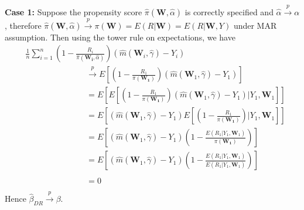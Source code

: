 \documentclass[12pt,twoside]{article}
\begin{document}
\textbf{Case 1:} Suppose the propensity score $\hat\pi(\mathbf{W},\hat{\alpha})$ is correctly specified and $\hat{\alpha} \xrightarrow{p} \alpha$, therefore  $\hat\pi(\mathbf{W},\hat{\alpha}) \xrightarrow{p} \pi(\mathbf{W}) = E(R|\mathbf{W}) = E(R|\mathbf{W}, Y)$ under MAR assumption. Then using the tower rule on expectations, we have
\begin{align*}
& \frac{1}{n}\sum_{i=1}^{n}\left(1 - \frac{R_i}{\hat\pi(\mathbf{W_i},\hat{\alpha})} \right) (\hat m(\mathbf{W}_i, \hat\gamma)-Y_i) \\
     & \phantom{E [(1 - \frac{R_1}{\pi(\mathbf{W_1})})} \xrightarrow{p} E \left[\left(1 - \frac{R_1}{\pi(\mathbf{W_1})} \right) (\hat m(\mathbf{W}_1, \hat\gamma)-Y_1)\right]  \\
     & \phantom{E [(1 - \frac{R_1}{\pi(\mathbf{W_1})})} = E\left[E\left[\left(1 - \frac{R_1}{\pi(\mathbf{W_1})} \right) (\hat m(\mathbf{W}_1, \hat\gamma)-Y_1)|Y_1, \mathbf{W}_1\right]\right] \\
     & \phantom{E [(1 - \frac{R_1}{\pi(\mathbf{W_1})})} = E\left[ (\hat m(\mathbf{W}_1, \hat\gamma)-Y_1)E\left[\left(1 - \frac{R_1}{\pi(\mathbf{W_1})} \right)|Y_1, \mathbf{W}_1\right]\right] \\
     & \phantom{E [(1 - \frac{R_1}{\pi(\mathbf{W_1})})} = E\left[ (\hat m(\mathbf{W}_1, \hat\gamma)-Y_1)\left(1 - \frac{E(R_1|Y_1, \mathbf{W}_1)}{\pi(\mathbf{W_1})} \right)\right] \\
     & \phantom{E [(1 - \frac{R_1}{\pi(\mathbf{W_1})})} = E\left[ (\hat m(\mathbf{W}_1, \hat\gamma)-Y_1)\left(1 - \frac{E(R_1|Y_1, \mathbf{W}_1)}{E(R_1|Y_1, \mathbf{W}_1)} \right)\right] \\
     &  \phantom{E [(1 - \frac{R_1}{\pi(\mathbf{W_1})})} = 0
\end{align*}
Hence $\hat{\beta}_{DR} \xrightarrow{p} \beta$. \\
\end{document}
